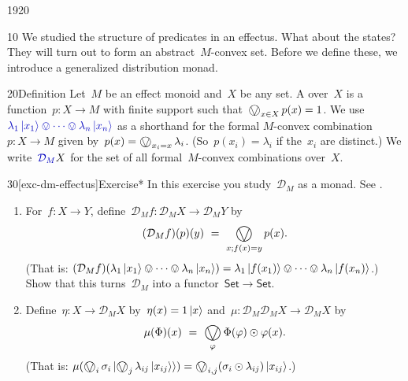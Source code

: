 \begin{parsec}{1920}%
\begin{point}{10}%
We studied the structure of predicates in an effectus.  What about the states?
They will turn out to form an abstract~$M$-convex set.
Before we define these, we introduce a generalized distribution monad.
\end{point}
\begin{point}{20}{Definition}%
Let~$M$ be an effect monoid
    and~$X$ be any set.
A  over~$X$
    is a function~$p\colon X \to M$
    with finite support
    such that~$\bigovee_{x \in X} p(x) = 1$.
We use~$\Define{\lambda_1 \ket{x_1} \ovee \cdots \ovee \lambda_n \ket{x_n}}$
    as a shorthand for the formal $M$-convex combination~$p\colon X \to M$
    given by~$p(x) = \bigovee_{x_i = x} \lambda_i$.
    (So~$p(x_i) = \lambda_i$ if the~$x_i$ are distinct.)
We write~$\Define{\mathcal{D}_M} X$
    for the set of all formal~$M$-convex combinations over~$X$.
\end{point}
\begin{point}{30}[exc-dm-effectus]{Exercise*}%
    In this exercise you study~$\mathcal{D}_M$ as a monad.
    See \cite{probdistrconv,basmsc}.
\begin{enumerate}
\item
For~$f\colon X \to Y$,
    define~$\mathcal{D}_M f \colon \mathcal{D}_M X \to \mathcal{D}_M Y$
    by
    \begin{equation*}
    (\mathcal{D}_M f)(p)(y) \ =\  \bigovee_{x; f(x)=y} p(x).
    \end{equation*}
    (That is: $(\mathcal{D}_M f) (\lambda_1 \ket{x_1} \ovee \cdots
            \ovee \lambda_n \ket{x_n})
            = \lambda_1 \ket{f(x_1)} \ovee \cdots
            \ovee \lambda_n \ket{f(x_n)} $.)
Show that this turns~$\mathcal{D}_M$ into a functor~$\mathsf{Set} \to \mathsf{Set}$.
\item
Define~$\eta \colon X \to \mathcal{D}_M X$
    by~$\eta(x) = 1\ket{x}$
    and~$\mu\colon \mathcal{D}_M \mathcal{D}_M X \to \mathcal{D}_M X$ by
    \begin{equation*}
        \mu(\Phi)(x) \ = \ 
        \bigovee_{\varphi}
        \Phi(\varphi) \odot \varphi(x).
    \end{equation*}
(That is: 
        $\mu (\bigovee_i \sigma_i \ket{\bigovee_j \lambda_{ij} \ket{x_{ij}}})
            = \bigovee_{i,j} (\sigma_i \odot \lambda_{ij})\ket{x_{ij}}$.)\\

\end{enumerate}
\end{point}
\end{parsec}
